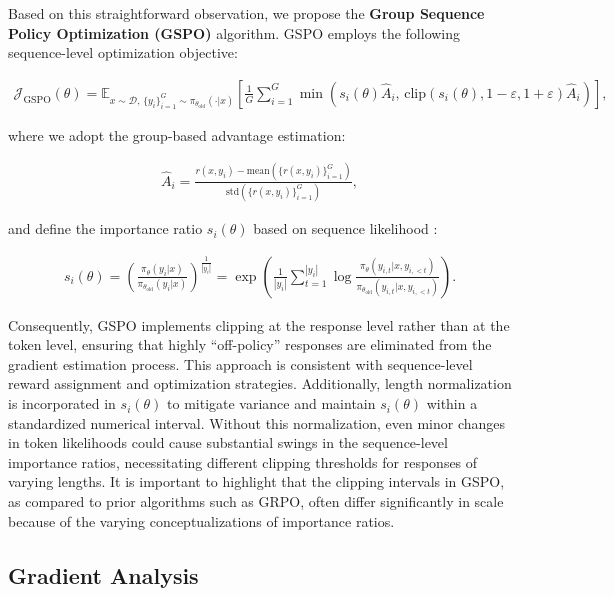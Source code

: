 Based on this straightforward observation, we propose the \textbf{Group Sequence Policy Optimization (GSPO)} algorithm. GSPO employs the following sequence-level optimization objective:

\begin{align}
\mathcal{J}_\text{GSPO} (\theta) =
\mathbb{E}_{ x \sim \mathcal{D},\, \{y_i\}_{i=1}^G \sim \pi_{\theta_\text{old}}( \cdot | x) }
\left[ 
\frac{1}{G} \sum_{i=1}^{G}
\min \left( s_{i}(\theta)  \widehat{A}_{i},  \, \mathrm{clip} \left( s_{i}(\theta), 1 - {\varepsilon}, 1 + {\varepsilon} \right) \widehat{A}_{i} \right) 
\right],
\label{equ:gspo}
\end{align}

where we adopt the group-based advantage estimation:

\begin{align}
\widehat{A}_{i} = \frac{r(x, y_i) - \mathrm{mean} \left( \{ r(x, y_i) \}_{i=1}^G \right) }{ \mathrm{std} \left( \{ r(x, y_i) \}_{i=1}^G \right) },
\end{align}

and define the importance ratio $s_{i}(\theta)$ based on sequence likelihood \citep{click}:

\begin{align}
s_{i}(\theta) = \left( \frac{ \pi_{\theta} (y_i | x) }{ \pi_{\theta_\text{old}} (y_i | x)} \right)^{\frac{1}{|y_i|}}
=
\exp \left( \frac{1}{|y_i|} \sum_{t=1}^{|y_i|} \log \frac{ \pi_{\theta} (y_{i,t} | x, y_{i,<t}) }{ \pi_{\theta_\text{old}} (y_{i,t} | x,y_{i,<t})} \right).
\end{align}

Consequently, GSPO implements clipping at the response level rather than at the token level, ensuring that highly ``off-policy'' responses are eliminated from the gradient estimation process. This approach is consistent with sequence-level reward assignment and optimization strategies. Additionally, length normalization is incorporated in $s_{i}(\theta)$ to mitigate variance and maintain $s_{i}(\theta)$ within a standardized numerical interval. Without this normalization, even minor changes in token likelihoods could cause substantial swings in the sequence-level importance ratios, necessitating different clipping thresholds for responses of varying lengths. It is important to highlight that the clipping intervals in GSPO, as compared to prior algorithms such as GRPO, often differ significantly in scale because of the varying conceptualizations of importance ratios.

\subsection{Gradient Analysis}
\label{subsec:gradient}

